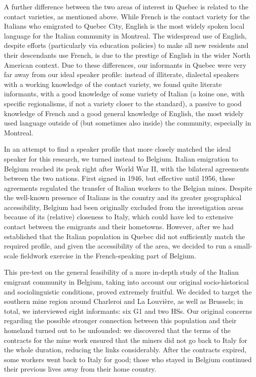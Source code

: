 \documentclass[output=paper,hidelinks]{langscibook}
\begin{document}
A further difference between the two areas of interest in Quebec is related to the contact varieties, as mentioned above. While French is the contact variety for the Italians who emigrated to Quebec City, English is the most widely spoken local language for the Italian community in Montreal. The widespread use of English, despite efforts (particularly via education policies) to make all new residents and their descendants use French, is due to the prestige of English in the wider North American context. Due to these differences, our informants in Quebec were very far away from our ideal speaker profile: instead of illiterate, dialectal speakers with a working knowledge of the contact variety, we found quite literate informants, with a good knowledge of some variety of Italian (a koine one, with specific regionalisms, if not a variety closer to the standard), a passive to good knowledge of French and a good general knowledge of English, the most widely used language outside of (but sometimes also inside) the community, especially in Montreal.

In an attempt to find a speaker profile that more closely matched the ideal speaker for this research, we turned instead to Belgium. Italian emigration to Belgium reached its peak right after World War II, with the bilateral agreements between the two nations. First signed in 1946, but effective until 1956, these agreements regulated the transfer of Italian workers to the Belgian mines. Despite the well-known presence of Italians in the country and its greater geographical accessibility, Belgium had been originally excluded from the investigation areas because of its (relative) closeness to Italy, which could have led to extensive contact between the emigrants and their hometowns. However, after we had established that the Italian population in Quebec did not sufficiently match the required profile, and given the accessibility of the area, we decided to run a small-scale fieldwork exercise in the French-speaking part of Belgium. 

This pre-test on the general feasibility of a more in-depth study of the Italian emigrant community in Belgium, taking into account our original socio-historical and sociolinguistic conditions, proved extremely fruitful. We decided to target the southern mine region around Charleroi and La Louvière, as well as Brussels; in total, we interviewed eight informants: six G1 and two HSs. Our original concerns regarding the possible stronger connection between this population and their homeland turned out to be unfounded: we discovered that the terms of the contracts for the mine work ensured that the miners did not go back to Italy for the whole duration, reducing the links considerably. After the contracts expired, some workers went back to Italy for good; those who stayed in Belgium continued their previous lives away from their home country.
\end{document}

